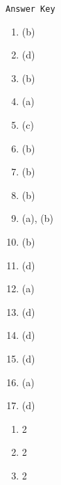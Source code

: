 \begin{center}
\texttt{Answer Key}
\begin{multicols}{5}
\begin{enumerate}
\item (b)
\item (d)
\item (b)
\item (a)
\item (c)
\item (b)
\item (b)
\item (b)
\item (a), (b)
\item (b)
\item (d)
\item (a)
\item (d)
\item (d)
\item (d)
\item (a)
\item (d)
\end{enumerate}
\begin{enumerate}\addtocounter{enumi}{17}
\item 2
\item 2
\item 2
\end{enumerate}
\end{multicols}
\end{center}
